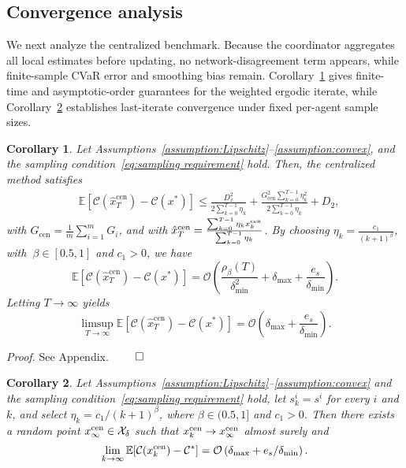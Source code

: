 \documentclass[twocolumn]{autart}    %
\newcommand{\order}[1]{\mathcal{O}\left(#1\right)}
\newtheorem{corollary}{Corollary}
\newcommand{\1}{\mathbf{1}}
\begin{document}
\subsection{Convergence analysis}\label{sec:centralize convergence}
We next analyze the centralized benchmark.  Because the coordinator aggregates all local estimates before updating, no network-disagreement term appears, while finite-sample CVaR error and smoothing bias remain.
Corollary~\ref{coro:centralize ergodic} gives finite-time and asymptotic-order guarantees for the weighted ergodic iterate, while Corollary~\ref{coro:centralize last-iter} establishes last-iterate convergence under fixed per-agent sample sizes.
\begin{corollary}\label{coro:centralize ergodic}
Let Assumptions~\ref{assumption:Lipschitz}--\ref{assumption:convex}, and the sampling condition~\ref{eq:sampling requirement} hold. Then, the centralized method satisfies
\begin{align}\label{eq:centralize deviation result}
&\mathbb{E}[\mathcal{C}(\hat{x}_{T}^{\text{cen}}) - \mathcal{C}(x^\ast)] \! \le \! \frac{D_{x}^{2}}{2 \sum_{k=0}^{T-1} \eta_{k}}  \!+ \! \frac{G_{\text{cen}}^{2} \sum_{k=0}^{T-1} \eta_{k}^{2}}{2 \sum_{k=0}^{T-1} \eta_{k}} \! + \! D_2  ,
\end{align}
with $G_{\text{cen}} =\frac{1}{m} \sum_{i=1}^{m} G_i$, and with $\hat{x}_{T}^{\text{cen}} = \frac{\sum_{k=0}^{T-1} \eta_{k} x_k^{\rm cen}}{\sum_{k=0}^{T-1} \eta_{k}}$.
By choosing $\eta_{k} = \frac{c_1}{(k+1)^\beta} $, with $\ \beta \in [0.5, 1]$ and  $c_1 >0$, we have 
\begin{equation*}
\mathbb{E}[\mathcal{C}(\hat{x}_T^{\text{cen}}) - \mathcal{C}(x^\ast)] = \order{\frac{\rho_\beta(T)}{\delta_{\min}^2} + \delta_{\max} + \frac{e_s}{\delta_{\min}}} .
\end{equation*}
Letting $T\to\infty$ yields
\begin{equation*}
 \mathop{\lim\sup}_{T\to \infty}\mathbb{E}[\mathcal{C}(\hat{x}_T^{\text{cen}}) - \mathcal{C}(x^\ast)] = \order{  \delta_{\max} + \frac{e_s}{\delta_{\min}}}   .
\end{equation*}
\end{corollary}
\textit{Proof.} 
See Appendix.
\hfill $\qed$
\begin{corollary}\label{coro:centralize last-iter}
Let Assumptions~\ref{assumption:Lipschitz}--\ref{assumption:convex} 
and the sampling condition~\eqref{eq:sampling requirement} hold, 
let $s_k^i=s^i$ for every $i$ and $k$, and select $\eta_k=c_1/(k+1)^\beta$, 
where $\beta\in(0.5,1]$ and $c_1>0$. 
Then there exists a random point $x_\infty^{\rm cen}\in \mathcal X_\delta$ 
such that $x_k^{\rm cen}\to x_\infty^{\rm cen}$ almost surely and
\begin{align*}
 \lim_{k\to\infty}\mathbb{E}[\mathcal C(x_k^{\rm cen})-\mathcal C^\ast] 
=\order{\delta_{\max}+e_s/\delta_{\min}}. 
\end{align*}
\end{corollary}
\end{document}

